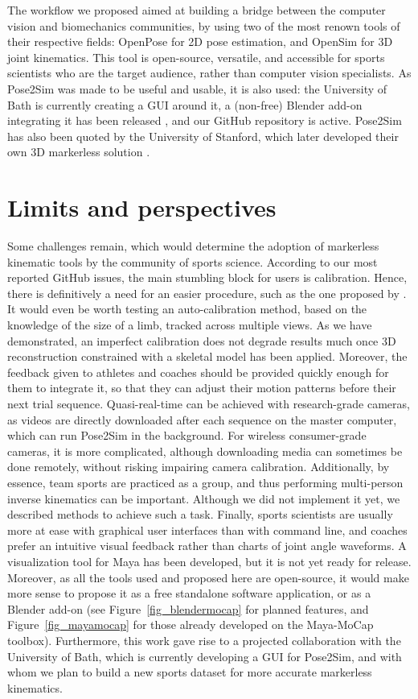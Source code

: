 The workflow we proposed aimed at building a bridge between the computer vision and biomechanics communities, by using two of the most renown tools of their respective fields: OpenPose for 2D pose estimation, and OpenSim for 3D joint kinematics. This tool is open-source, versatile, and accessible for sports scientists who are the target audience, rather than computer vision specialists. As Pose2Sim was made to be useful and usable, it is also used: the University of Bath is currently creating a GUI around it, a (non-free) Blender add-on integrating it has been released \cite{Barreto2022}, and our GitHub repository is active. Pose2Sim has also been quoted by the University of Stanford, which later developed their own 3D markerless solution \cite{Uhlrich2022}. 


\section*{Limits and perspectives}
Some challenges remain, which would determine the adoption of markerless kinematic tools by the community of sports science. According to our most reported GitHub issues, the main stumbling block for users is calibration. Hence, there is definitively a need for an easier procedure, such as the one proposed by \cite{Argus}. It would even be worth testing an auto-calibration method, based on the knowledge of the size of a limb, tracked across multiple views. As we have demonstrated, an imperfect calibration does not degrade results much once 3D reconstruction constrained with a skeletal model has been applied. Moreover, the feedback given to athletes and coaches should be provided quickly enough for them to integrate it, so that they can adjust their motion patterns before their next trial sequence. Quasi-real-time can be achieved with research-grade cameras, as videos are directly downloaded after each sequence on the master computer, which can run Pose2Sim in the background. For wireless consumer-grade cameras, it is more complicated, although downloading media can sometimes be done remotely, without risking impairing camera calibration. Additionally, by essence, team sports are practiced as a group, and thus performing multi-person inverse kinematics can be important. Although we did not implement it yet, we described methods to achieve such a task. Finally, sports scientists are usually more at ease with graphical user interfaces than with command line, and coaches prefer an intuitive visual feedback rather than charts of joint angle waveforms. A visualization tool for Maya has been developed, but it is not yet ready for release. Moreover, as all the tools used and proposed here are open-source, it would make more sense to propose it as a free standalone software application, or as a Blender add-on (see Figure~\ref{fig_blendermocap} for planned features, and Figure~\ref{fig_mayamocap} for those already developed on the Maya-MoCap toolbox). Furthermore, this work gave rise to a projected collaboration with the University of Bath, which is currently developing a GUI for Pose2Sim, and with whom we plan to build a new sports dataset for more accurate markerless kinematics. 

